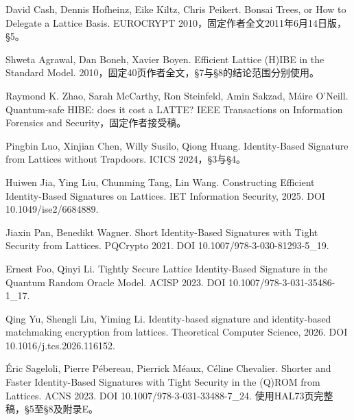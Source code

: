 \documentclass[UTF8,a4paper,12pt,oneside,openany,fontset=fandol]{ctexrep}
\begin{document}
\begingroup\small\noindent [2] David Cash, Dennis Hofheinz, Eike Kiltz, Chris Peikert. Bonsai Trees, or How to Delegate a Lattice Basis. EUROCRYPT 2010，固定作者全文2011年6月14日版，\S{}5。\par\endgroup

\begingroup\small\noindent [3] Shweta Agrawal, Dan Boneh, Xavier Boyen. Efficient Lattice (H)IBE in the Standard Model. 2010，固定40页作者全文，\S{}7与\S{}8的结论范围分别使用。\par\endgroup

\begingroup\small\noindent [4] Raymond K. Zhao, Sarah McCarthy, Ron Steinfeld, Amin Sakzad, Máire O'Neill. Quantum-safe HIBE: does it cost a LATTE? IEEE Transactions on Information Forensics and Security，固定作者接受稿。\par\endgroup

\begingroup\small\noindent [5] Pingbin Luo, Xinjian Chen, Willy Susilo, Qiong Huang. Identity-Based Signature from Lattices without Trapdoors. ICICS 2024，\S{}3与\S{}4。\par\endgroup

\begingroup\small\noindent [6] Huiwen Jia, Ying Liu, Chunming Tang, Lin Wang. Constructing Efficient Identity-Based Signatures on Lattices. IET Information Security, 2025. DOI 10.1049/ise2/6684889.\par\endgroup

\begingroup\small\noindent [7] Jiaxin Pan, Benedikt Wagner. Short Identity-Based Signatures with Tight Security from Lattices. PQCrypto 2021. DOI 10.1007/978-3-030-81293-5\_19.\par\endgroup

\begingroup\small\noindent [8] Ernest Foo, Qinyi Li. Tightly Secure Lattice Identity-Based Signature in the Quantum Random Oracle Model. ACISP 2023. DOI 10.1007/978-3-031-35486-1\_17.\par\endgroup

\begingroup\small\noindent [9] Qing Yu, Shengli Liu, Yiming Li. Identity-based signature and identity-based matchmaking encryption from lattices. Theoretical Computer Science, 2026. DOI 10.1016/j.tcs.2026.116152.\par\endgroup

\begingroup\small\noindent [10] Éric Sageloli, Pierre Pébereau, Pierrick Méaux, Céline Chevalier. Shorter and Faster Identity-Based Signatures with Tight Security in the (Q)ROM from Lattices. ACNS 2023. DOI 10.1007/978-3-031-33488-7\_24. 使用HAL73页完整稿，\S{}5至\S{}8及附录E。\par\endgroup
\end{document}
